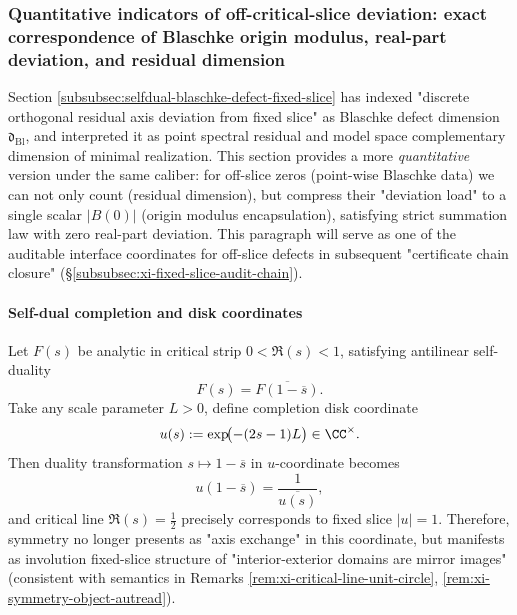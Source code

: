 \subsubsection{Quantitative indicators of off-critical-slice deviation: exact correspondence of Blaschke origin modulus, real-part deviation, and residual dimension}\label{subsubsec:xi-offslice-quantitative-indicators}
Section \ref{subsubsec:selfdual-blaschke-defect-fixed-slice} has indexed "discrete orthogonal residual axis deviation from fixed slice" as Blaschke defect dimension \(\mathfrak d_{\mathrm{Bl}}\), and interpreted it as point spectral residual and model space complementary dimension of minimal realization.
This section provides a more \emph{quantitative} version under the same caliber: for off-slice zeros (point-wise Blaschke data) we can not only count (residual dimension), but compress their "deviation load" to a single scalar \(|B(0)|\) (origin modulus encapsulation), satisfying strict summation law with zero real-part deviation.
This paragraph will serve as one of the auditable interface coordinates for off-slice defects in subsequent "certificate chain closure" (\S\ref{subsubsec:xi-fixed-slice-audit-chain}).

\paragraph{Self-dual completion and disk coordinates}
Let \(F(s)\) be analytic in critical strip \(0<\Re(s)<1\), satisfying antilinear self-duality
\begin{equation}\label{eq:xi-offslice-selfdual-on-strip}
F(s)=\overline{F(1-\overline s)}.
\end{equation}
Take any scale parameter \(L>0\), define completion disk coordinate
\begin{equation}\label{eq:xi-offslice-exp-disk-coordinate}
u(s):=\exp\!\bigl(-(2s-1)L\bigr)\in\CC^\times.
\end{equation}
Then duality transformation \(s\mapsto 1-\overline s\) in \(u\)-coordinate becomes
\begin{equation}\label{eq:xi-offslice-exp-disk-duality}
u(1-\overline s)=\frac{1}{\overline{u(s)}},
\end{equation}
and critical line \(\Re(s)=\tfrac12\) precisely corresponds to fixed slice \(|u|=1\).
Therefore, symmetry no longer presents as "axis exchange" in this coordinate, but manifests as involution fixed-slice structure of "interior-exterior domains are mirror images" (consistent with semantics in Remarks \ref{rem:xi-critical-line-unit-circle}, \ref{rem:xi-symmetry-object-autread}).

